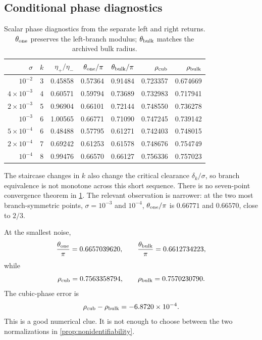 \documentclass[11pt]{article}
\theoremstyle{definition}
\theoremstyle{remark}
\begin{document}
\subsection{Conditional phase diagnostics}

\begin{table}[H]
\centering
\scriptsize
\caption{Scalar phase diagnostics from the separate left and right returns.
$\theta_{\rm one}$ preserves the left-branch modulus;
$\theta_{\rm bulk}$ matches the archived bulk radius.}
\label{tab:phase-diagnostics}
\begin{tabular}{rrrrrrr}
\toprule
$\sigma$ & $k$ & $\eta_+/\eta_-$ & $\theta_{\rm one}/\pi$
& $\theta_{\rm bulk}/\pi$ & $\rho_{\rm cub}$ & $\rho_{\rm bulk}$\\
\midrule
$10^{-2}$        &3&0.45858&0.57364&0.91484&0.723357&0.674669\\
$4\times10^{-3}$ &4&0.60571&0.59794&0.73689&0.732983&0.717941\\
$2\times10^{-3}$ &5&0.96904&0.66101&0.72144&0.748550&0.736278\\
$10^{-3}$        &6&1.00565&0.66771&0.71090&0.747245&0.739142\\
$5\times10^{-4}$ &6&0.48488&0.57795&0.61271&0.742403&0.748015\\
$2\times10^{-4}$ &7&0.69242&0.61253&0.61578&0.748676&0.754749\\
$10^{-4}$        &8&0.99476&0.66570&0.66127&0.756336&0.757023\\
\bottomrule
\end{tabular}
\end{table}

The staircase changes in $k$ also change the critical clearance
$\delta_k/\sigma$, so branch equivalence is not monotone across this short
sequence.  There is no seven-point convergence theorem in
\cref{tab:phase-diagnostics}.  The relevant observation is narrower: at the
two most branch-symmetric points, $\sigma=10^{-3}$ and $10^{-4}$,
$\theta_{\rm one}/\pi$ is $0.66771$ and $0.66570$, close to $2/3$.

At the smallest noise,
\begin{equation}\label{eq:smallest-phases}
 \frac{\theta_{\rm one}}\pi=0.6657039620,
 \qquad
 \frac{\theta_{\rm bulk}}\pi=0.6612734223,
\end{equation}
while
\begin{equation}\label{eq:smallest-cubic-match}
 \rho_{\rm cub}=0.7563358794,
 \qquad
 \rho_{\rm bulk}=0.7570230790.
\end{equation}
The cubic-phase error is
\begin{equation}\label{eq:smallest-cubic-error}
 \rho_{\rm cub}-\rho_{\rm bulk}
 =-6.8720\times10^{-4}.
\end{equation}
This is a good numerical clue.  It is not enough to choose between the two
normalizations in \cref{prop:nonidentifiability}.
\end{document}

